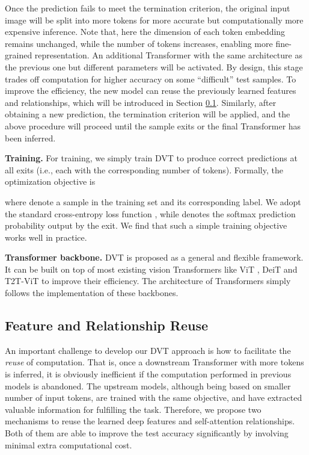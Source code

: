 \documentclass{article}
\begin{document}
Once the prediction fails to meet the termination criterion, the original input image will be split into more tokens for more accurate but computationally more expensive inference. Note that, here the dimension of each token embedding remains unchanged, while the number of tokens increases, enabling more fine-grained representation. An additional Transformer with the same architecture as the previous one but different parameters will be activated. By design, this stage trades off computation for higher accuracy on some ``difficult'' test samples. To improve the efficiency, the new model can reuse the previously learned features and relationships, which will be introduced in Section \ref{sec:reuse}. Similarly, after obtaining a new prediction, the termination criterion will be applied, and the above procedure will proceed until the sample exits or the final Transformer has been inferred.



\textbf{Training.}
For training, we simply train DVT to produce correct predictions at all exits (i.e., each with the corresponding number of tokens). Formally, the optimization objective is

where  denote a sample in the training set  and its corresponding label. We adopt the standard cross-entropy loss function , while  denotes the softmax prediction probability output by the  exit. We find that such a simple training objective works well in practice.

\textbf{Transformer backbone.}
DVT is proposed as a general and flexible framework. It can be built on top of most existing vision Transformers like ViT \cite{dosovitskiy2021an}, DeiT \cite{touvron2020training} and T2T-ViT \cite{yuan2021tokens} to improve their efficiency. The architecture of Transformers simply follows the implementation of these backbones.

\subsection{Feature and Relationship Reuse}
\label{sec:reuse}

An important challenge to develop our DVT approach is how to facilitate the \emph{reuse} of computation. That is, once a downstream Transformer with more tokens is inferred, it is obviously inefficient if the computation performed in previous models is abandoned. The upstream models, although being based on smaller number of input tokens, are trained with the same objective, and have extracted valuable information for fulfilling the task. Therefore, we propose two mechanisms to reuse the learned deep features and self-attention relationships. Both of them are able to improve the test accuracy significantly by involving minimal extra computational cost.
\end{document}
